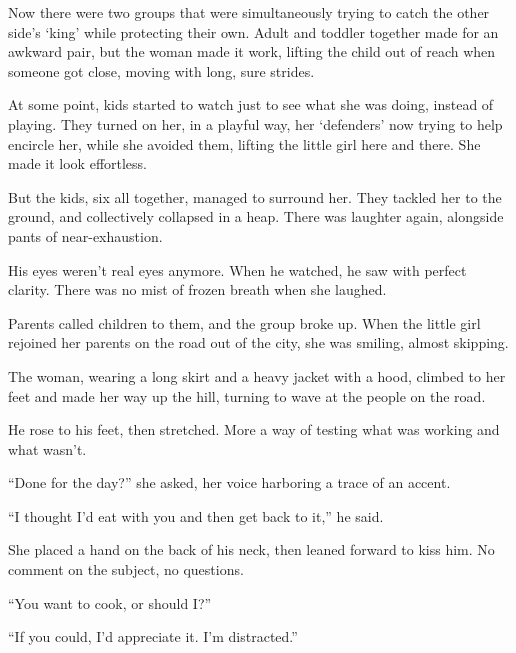 Now there were two groups that were simultaneously trying to catch the other side's `king' while protecting their own.  Adult and toddler together made for an awkward pair, but the woman made it work, lifting the child out of reach when someone got close, moving with long, sure strides.



At some point, kids started to watch just to see what she was doing, instead of playing.  They turned on her, in a playful way, her `defenders' now trying to help encircle her, while she avoided them, lifting the little girl here and there.  She made it look effortless.



But the kids, six all together, managed to surround her.  They tackled her to the ground, and collectively collapsed in a heap.  There was laughter again, alongside pants of near-exhaustion.



His eyes weren't real eyes anymore.  When he watched, he saw with perfect clarity.  There was no mist of frozen breath when she laughed.



Parents called children to them, and the group broke up.  When the little girl rejoined her parents on the road out of the city, she was smiling, almost skipping.



The woman, wearing a long skirt and a heavy jacket with a hood, climbed to her feet and made her way up the hill, turning to wave at the people on the road.



He rose to his feet, then stretched.  More a way of testing what was working and what wasn't.



``Done for the day?''  she asked, her voice harboring a trace of an accent.



``I thought I'd eat with you and then get back to it,'' he said.



She placed a hand on the back of his neck, then leaned forward to kiss him.  No comment on the subject, no questions.



``You want to cook, or should I?''



``If you could, I'd appreciate it.  I'm distracted.''



